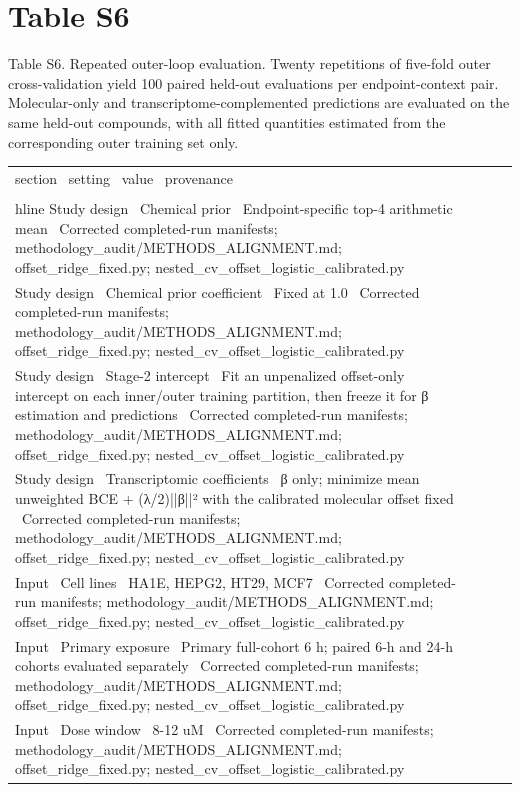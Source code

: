 \documentclass{article}
\begin{document}
\section*{Table S6}
Table S6. Repeated outer-loop evaluation. Twenty repetitions of five-fold outer cross-validation yield 100 paired held-out evaluations per endpoint-context pair. Molecular-only and transcriptome-complemented predictions are evaluated on the same held-out compounds, with all fitted quantities estimated from the corresponding outer training set only.
\begin{tabular}{llll}
section \ setting \ value \ provenance \\ \\hline
Study design \ Chemical prior \ Endpoint-specific top-4 arithmetic mean \ Corrected completed-run manifests; methodology_audit/METHODS_ALIGNMENT.md; offset_ridge_fixed.py; nested_cv_offset_logistic_calibrated.py \\
Study design \ Chemical prior coefficient \ Fixed at 1.0 \ Corrected completed-run manifests; methodology_audit/METHODS_ALIGNMENT.md; offset_ridge_fixed.py; nested_cv_offset_logistic_calibrated.py \\
Study design \ Stage-2 intercept \ Fit an unpenalized offset-only intercept on each inner/outer training partition, then freeze it for β estimation and predictions \ Corrected completed-run manifests; methodology_audit/METHODS_ALIGNMENT.md; offset_ridge_fixed.py; nested_cv_offset_logistic_calibrated.py \\
Study design \ Transcriptomic coefficients \ β only; minimize mean unweighted BCE + (λ/2)||β||² with the calibrated molecular offset fixed \ Corrected completed-run manifests; methodology_audit/METHODS_ALIGNMENT.md; offset_ridge_fixed.py; nested_cv_offset_logistic_calibrated.py \\
Input \ Cell lines \ HA1E, HEPG2, HT29, MCF7 \ Corrected completed-run manifests; methodology_audit/METHODS_ALIGNMENT.md; offset_ridge_fixed.py; nested_cv_offset_logistic_calibrated.py \\
Input \ Primary exposure \ Primary full-cohort 6 h; paired 6-h and 24-h cohorts evaluated separately \ Corrected completed-run manifests; methodology_audit/METHODS_ALIGNMENT.md; offset_ridge_fixed.py; nested_cv_offset_logistic_calibrated.py \\
Input \ Dose window \ 8-12 uM \ Corrected completed-run manifests; methodology_audit/METHODS_ALIGNMENT.md; offset_ridge_fixed.py; nested_cv_offset_logistic_calibrated.py \\

\end{tabular}
\end{document}
